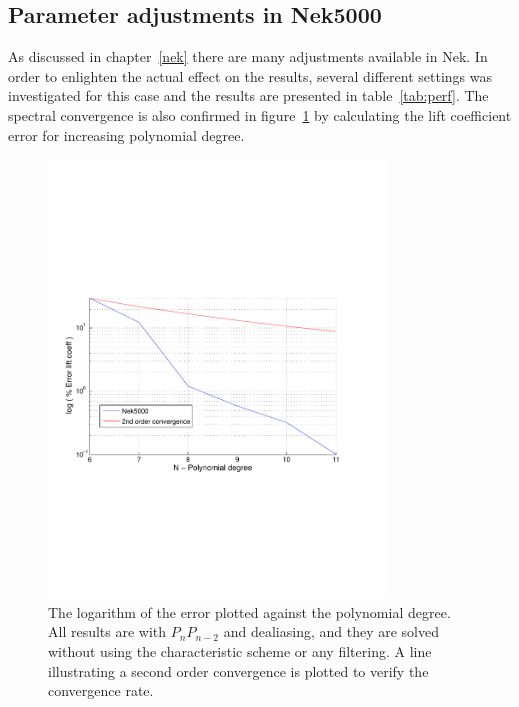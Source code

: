 \subsection{Parameter adjustments in Nek5000}
As discussed in chapter~\ref{nek} there are many adjustments available in Nek. 
In order to enlighten the actual effect on the results, several different settings was
investigated for this case and the results are presented in table~\ref{tab:perf}. 
The spectral convergence is also confirmed in figure~\ref{fig:liftconv} by calculating the 
lift coefficient error for increasing polynomial degree. 
%
\begin{figure}[h]
	\centerline{
        \includegraphics[trim=0.5cm 7cm 0.5cm 7cm, width=0.8\textwidth]{Figures/lift_coef2.pdf}}
	\caption{The logarithm of the error plotted against the polynomial degree. All results 
        are with $P_nP_{n-2}$ and dealiasing, and they are solved without using the 
    characteristic scheme or any filtering. A line illustrating a second order convergence is 
    plotted to verify the convergence rate.}
	\label{fig:liftconv}
\end{figure}
%

